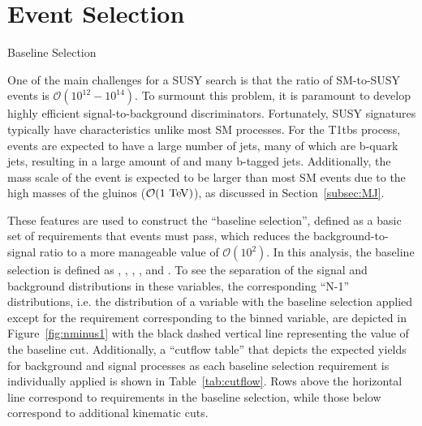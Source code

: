 \chapter{Event Selection}

\begin{section}{Baseline Selection}

One of the main challenges for a SUSY search is that the ratio of SM-to-SUSY events is $\mathcal{O}(10^{12} - 10^{14})$.
To surmount this problem, it is paramount to develop highly efficient signal-to-background discriminators.
Fortunately, SUSY signatures typically have characteristics unlike most SM processes.
For the T1tbs process, events are expected to have a large number of jets, many of which are b-quark jets, resulting in a large amount of \HT and many b-tagged jets.
Additionally, the mass scale of the event is expected to be larger than most SM events due to the high masses of the gluinos ($\mathcal{O}(1~\mathrm{Te\kern -0.1em V})$), as discussed in Section~\ref{subsec:MJ}.

These features are used to construct the ``baseline selection'', defined as a basic set of requirements that events must pass, which reduces the background-to-signal ratio to a more manageable value of $\mathcal{O}(10^2)$.
In this analysis, the baseline selection is defined as \baseNleps, \baseHT, \baseMJ, \baseNjets, and \baseNb.
To see the separation of the signal and background distributions in these variables, the corresponding ``N-1'' distributions, i.e. the distribution of a variable with the baseline selection applied except for the requirement corresponding to the binned variable, are depicted in Figure~\ref{fig:nminus1} with the black dashed vertical line representing the value of the baseline cut.
Additionally, a ``cutflow table'' that depicts the expected yields for background and signal processes as each baseline selection requirement is individually applied is shown in Table~\ref{tab:cutflow}.
Rows above the horizontal line correspond to requirements in the baseline selection, while those below correspond to additional kinematic cuts.


\end{section}
